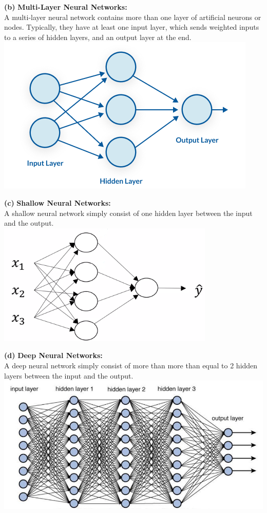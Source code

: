 \documentclass[11pt]{article}
\renewcommand\part[1]{\vspace{.10in}\textbf{(#1)}}
\newcommand\multilayer{\vspace{.10in}\textbf{Multi-Layer Neural Networks: }}
\newcommand\snn{\vspace{.10in}\textbf{Shallow Neural Networks: }}
\newcommand\dnn{\vspace{.10in}\textbf{Deep Neural Networks: }}
\begin{document}
\part{b} \multilayer \\A multi-layer neural network contains more than one layer of artificial neurons or nodes. Typically, they have at least one input layer, which sends weighted inputs to a series of hidden layers, and an output layer at the end.\\
\includegraphics[scale=0.6]{ml.png}

\part{c} \snn \\A shallow neural network simply consist of one hidden layer between the input and the output.\\
\includegraphics[scale=0.45]{snn.png}

\part{d} \dnn \\A deep neural network simply consist of more than more than equal to 2 hidden layers between the input and the output.\\
\includegraphics[scale=0.4]{dnn.jpeg}
\end{document}
